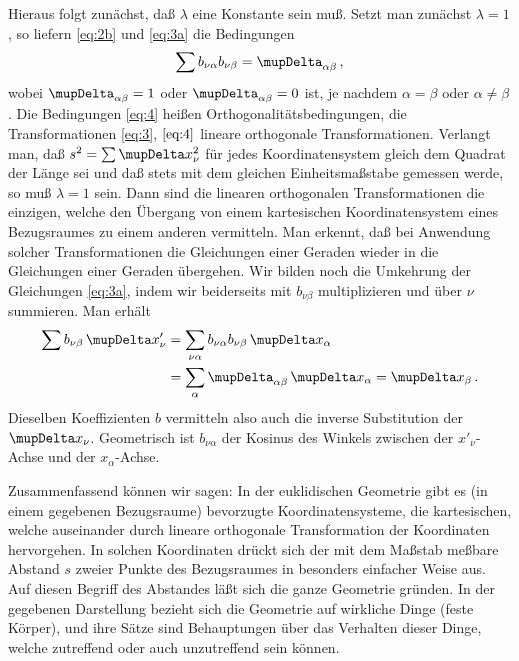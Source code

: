 Hieraus folgt zunächst, daß $\lambda$ eine Konstante sein muß. Setzt man 
zunächst $\lambda = 1$, so liefern \eqref{eq:2b} und \eqref{eq:3a} die
Bedingungen
\begin{align}
	\sum b_{\nu \alpha} b_{\nu\beta} = \Dva_{\alpha\beta}\,,
	\label{eq:4}
\end{align}
wobei $\Dva_{\alpha\beta} = 1$ oder $\Dva_{\alpha\beta} = 0$ ist, je 
nachdem $\alpha = \beta$ oder $\alpha \neq \beta$. Die Bedingungen 
\eqref{eq:4} heißen Orthogonalitätsbedingungen, die Transformationen 
\eqref{eq:3}, $\eqref{eq:4}$ lineare orthogonale Transformationen. Verlangt 
man, daß $s^2 = \sum \Dva x_{\nu}^2$ für jedes Koordinatensystem gleich dem 
Quadrat der Länge sei und daß stets mit dem gleichen Einheitsmaßstabe gemessen 
werde, so muß $\lambda = 1$ sein. Dann sind die linearen orthogonalen 
Transformationen die einzigen, welche den Übergang von einem kartesischen 
Koordinatensystem eines Bezugsraumes zu einem anderen vermitteln. Man erkennt, 
daß bei Anwendung solcher Transformationen die Gleichungen einer Geraden 
wieder in die Gleichungen einer Geraden übergehen. Wir bilden noch die 
Umkehrung der Gleichungen \eqref{eq:3a}, indem wir beiderseits mit 
$b_{\nu\beta}$ multiplizieren und über $\nu$ summieren. Man erhält
\begin{align}
\begin{aligned}
	\sum b_{\nu\beta}\, \Dva x'_{\nu} &= \sum_{\nu\alpha}
		b_{\nu\alpha} b_{\nu\beta} \,\Dva x_{\alpha}
		\\ 
		&= \sum_{\alpha}
		\Dva_{\alpha\beta}\,\Dva x_{\alpha} = \Dva x_{\beta}\,.
\end{aligned}
	\label{eq:5}
\end{align}
Dieselben Koeffizienten $b$ vermitteln also auch die inverse Substitution der 
$\Dva x_{\nu}$. Geometrisch ist $b_{\nu\alpha}$ der Kosinus des Winkels 
zwischen der $x'_{\nu}$-Achse und der $x_{\alpha}$-Achse.

Zusammenfassend können wir sagen: In der euklidischen Geometrie gibt es (in 
einem gegebenen Bezugsraume) bevorzugte Koordinatensysteme, die kartesischen, 
welche auseinander durch lineare orthogonale Transformation der Koordinaten 
hervorgehen. In solchen Koordinaten drückt sich der mit dem Maßstab meßbare 
Abstand $s$ zweier Punkte des Bezugsraumes in besonders einfacher Weise aus. 
Auf diesen Begriff des Abstandes läßt sich die ganze Geometrie gründen. In der
gegebenen Darstellung bezieht sich die Geometrie auf wirkliche Dinge (feste 
Körper), und ihre Sätze sind Behauptungen über das Verhalten dieser Dinge, 
welche zutreffend oder auch unzutreffend sein können.

